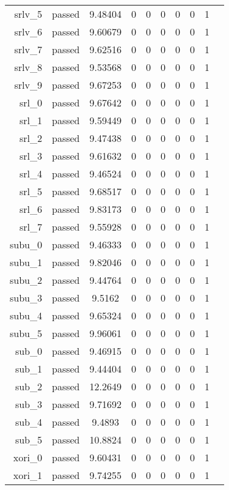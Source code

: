 \begin{longtable}{r|ccccccccc}
    srlv\_5 & passed & 9.48404 & 0 & 0 & 0 & 0 & 0 & 1 \\
    srlv\_6 & passed & 9.60679 & 0 & 0 & 0 & 0 & 0 & 1 \\
    srlv\_7 & passed & 9.62516 & 0 & 0 & 0 & 0 & 0 & 1 \\
    srlv\_8 & passed & 9.53568 & 0 & 0 & 0 & 0 & 0 & 1 \\
    srlv\_9 & passed & 9.67253 & 0 & 0 & 0 & 0 & 0 & 1 \\
    srl\_0 & passed & 9.67642 & 0 & 0 & 0 & 0 & 0 & 1 \\
    srl\_1 & passed & 9.59449 & 0 & 0 & 0 & 0 & 0 & 1 \\
    srl\_2 & passed & 9.47438 & 0 & 0 & 0 & 0 & 0 & 1 \\
    srl\_3 & passed & 9.61632 & 0 & 0 & 0 & 0 & 0 & 1 \\
    srl\_4 & passed & 9.46524 & 0 & 0 & 0 & 0 & 0 & 1 \\
    srl\_5 & passed & 9.68517 & 0 & 0 & 0 & 0 & 0 & 1 \\
    srl\_6 & passed & 9.83173 & 0 & 0 & 0 & 0 & 0 & 1 \\
    srl\_7 & passed & 9.55928 & 0 & 0 & 0 & 0 & 0 & 1 \\
    subu\_0 & passed & 9.46333 & 0 & 0 & 0 & 0 & 0 & 1 \\
    subu\_1 & passed & 9.82046 & 0 & 0 & 0 & 0 & 0 & 1 \\
    subu\_2 & passed & 9.44764 & 0 & 0 & 0 & 0 & 0 & 1 \\
    subu\_3 & passed & 9.5162 & 0 & 0 & 0 & 0 & 0 & 1 \\
    subu\_4 & passed & 9.65324 & 0 & 0 & 0 & 0 & 0 & 1 \\
    subu\_5 & passed & 9.96061 & 0 & 0 & 0 & 0 & 0 & 1 \\
    sub\_0 & passed & 9.46915 & 0 & 0 & 0 & 0 & 0 & 1 \\
    sub\_1 & passed & 9.44404 & 0 & 0 & 0 & 0 & 0 & 1 \\
    sub\_2 & passed & 12.2649 & 0 & 0 & 0 & 0 & 0 & 1 \\
    sub\_3 & passed & 9.71692 & 0 & 0 & 0 & 0 & 0 & 1 \\
    sub\_4 & passed & 9.4893 & 0 & 0 & 0 & 0 & 0 & 1 \\
    sub\_5 & passed & 10.8824 & 0 & 0 & 0 & 0 & 0 & 1 \\
    xori\_0 & passed & 9.60431 & 0 & 0 & 0 & 0 & 0 & 1 \\
    xori\_1 & passed & 9.74255 & 0 & 0 & 0 & 0 & 0 & 1 \\

\end{longtable}
